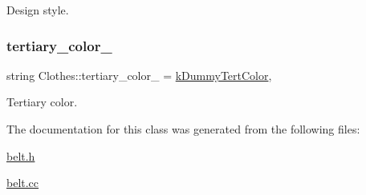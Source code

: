 Design style. 

\mbox{\label{classClothes_a3c5f1e7ab531e3ba7a38b930da8078a0}} 
\subsubsection{\texorpdfstring{tertiary\+\_\+color\+\_\+}{tertiary\_color\_}}
{\footnotesize\ttfamily string Clothes\+::tertiary\+\_\+color\+\_\+ = \mbox{\hyperlink{clothes_8h_a094dde85547895fd70dafb3ab10c6783}{k\+Dummy\+Tert\+Color}}\hspace{0.3cm}{\ttfamily [protected]}, {\ttfamily [inherited]}}



Tertiary color. 



The documentation for this class was generated from the following files\+:\begin{DoxyCompactItemize}
\item 
\mbox{\hyperlink{belt_8h}{belt.\+h}}\item 
\mbox{\hyperlink{belt_8cc}{belt.\+cc}}\end{DoxyCompactItemize}
